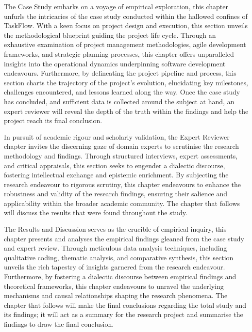 \par{The Case Study embarks on a voyage of empirical exploration, this chapter unfurls the intricacies of the case study conducted within the hallowed confines of TaskFlow. With a keen focus on project design and execution, this section unveils the methodological blueprint guiding the project life cycle. Through an exhaustive examination of project management methodologies, agile development frameworks, and strategic planning processes, this chapter offers unparalleled insights into the operational dynamics underpinning software development endeavours. Furthermore, by delineating the project pipeline and process, this section charts the trajectory of the project's evolution, elucidating key milestones, challenges encountered, and lessons learned along the way. Once the case study has concluded, and sufficient data is collected around the subject at hand, an expert reviewer will reveal the depth of the truth within the findings and help the project reach its final conclusion.}
\par{In pursuit of academic rigour and scholarly validation, the Expert Reviewer chapter invites the discerning gaze of domain experts to scrutinise the research methodology and findings. Through structured interviews, expert assessments, and critical appraisals, this section seeks to engender a dialectic discourse, fostering intellectual exchange and epistemic enrichment. By subjecting the research endeavour to rigorous scrutiny, this chapter endeavours to enhance the robustness and validity of the research findings, ensuring their salience and applicability within the broader academic community. The chapter that follows will discuss the results that were found throughout the study.}
\par{The Results and Discussion serves as the crucible of empirical inquiry, this chapter presents and analyses the empirical findings gleaned from the case study and expert review. Through meticulous data analysis techniques, including qualitative coding, thematic analysis, and comparative synthesis, this section unveils the rich tapestry of insights garnered from the research endeavour. Furthermore, by fostering a dialectic discourse between empirical findings and theoretical frameworks, this chapter endeavours to unravel the underlying mechanisms and causal relationships shaping the research phenomena. The chapter that follows will make the final conclusions regarding the total study and its findings; it will act as a summary for the research project and summarise the findings to draw the final conclusion.}
